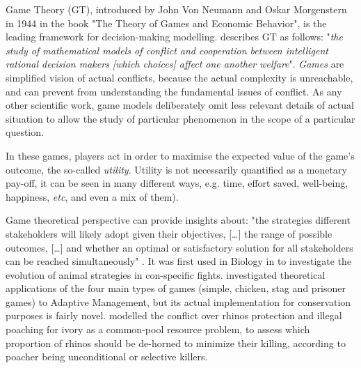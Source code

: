\documentclass[12pt,a4paper]{article}
\begin{document}
Game Theory (GT), introduced by John Von Neumann and Oskar Morgenstern in 1944 in the book "The Theory of Games and Economic Behavior", is the leading framework for decision-making modelling.
\cite{myerson1997game} describes GT as follows: "\textit{the study of mathematical models of conflict and cooperation between intelligent rational decision makers [which choices] affect one another welfare}".
\textit{Games} are simplified vision of actual conflicts, because the actual complexity is unreachable, and can prevent from understanding the fundamental issues of conflict. %
As any other scientific work, game models deliberately omit less relevant details of actual situation to allow the study of particular phenomenon in the scope of a particular question.

In these games, players act in order to maximise the expected value of the game's outcome, the so-called \textit{utility}.
Utility is not necessarily quantified as a monetary pay-off, it can be seen in many different ways, e.g. time, effort saved, well-being, happiness, \textit{etc}, and even a mix of them).

Game theoretical perspective can provide insights about: "the strategies different stakeholders will likely adopt given their objectives, [\dots] the range of possible outcomes, [\dots] and whether an optimal or satisfactory solution for all stakeholders can be reached simultaneously" \citep{COLYVAN20111246}.
It was first used in Biology in \cite{maynard1973logic} to investigate the evolution of animal strategies in con-specific fights.
\cite{COLYVAN20111246} investigated theoretical applications of the four main types of games (simple, chicken, stag and prisoner games) to Adaptive Management, but its actual implementation for conservation purposes is fairly novel. 
\cite{glynatsi2018evolutionary} modelled the conflict over rhinos protection and illegal poaching for ivory as a common-pool resource problem, to assess which proportion of rhinos should be de-horned to minimize their killing, according to poacher being unconditional or selective killers. %
\end{document}

